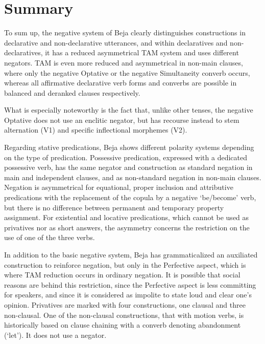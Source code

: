 \documentclass[output=paper,colorlinks,citecolor=brown]{langscibook}
\begin{document}
\section{Summary}
\largerpage[2] %
To sum up, the negative system of Beja clearly distinguishes constructions in declarative and non-declarative utterances, and within declaratives and non-decl\-aratives, it has a reduced asymmetrical TAM system and uses different negators. TAM is even more reduced and asymmetrical in non-main clauses, where only the negative Optative or the negative Simultaneity converb occurs, whereas all affirmative declarative verb forms and converbs are possible in balanced and deranked clauses respectively.

What is especially noteworthy is the fact that, unlike other tenses, the negative Optative does not use an enclitic negator, but has recourse instead to stem alternation (V1) and specific inflectional morphemes (V2). 

Regarding stative predications, Beja shows different polarity systems depending on the type of predication. Possessive predication, expressed with a dedicated possessive verb, has the same negator and construction as standard negation in main and independent clauses, and as non-standard negation in non-main clauses. Negation is asymmetrical for equational, proper inclusion and attributive predications with the replacement of the copula by a negative ‘be/become’ verb, but there is no difference between permanent and temporary property assignment. For existential and locative predications, which cannot be used as privatives nor as short answers, the asymmetry concerns the restriction on the use of one of the three verbs.

In addition to the basic negative system, Beja has grammaticalized an auxiliated construction to reinforce negation, but only in the Perfective aspect, which is where TAM reduction occurs in ordinary negation. It is possible that social reasons are behind this restriction, since the Perfective aspect is less committing for speakers, and since it is considered as impolite to state loud and clear one’s opinion.
\newpage
Privatives are marked with four constructions, one clausal and three non-clausal. One of the non-clausal constructions, that with motion verbs, is historically based on clause chaining with a converb denoting abandonment (‘let’). It does not use a negator.
\end{document}
